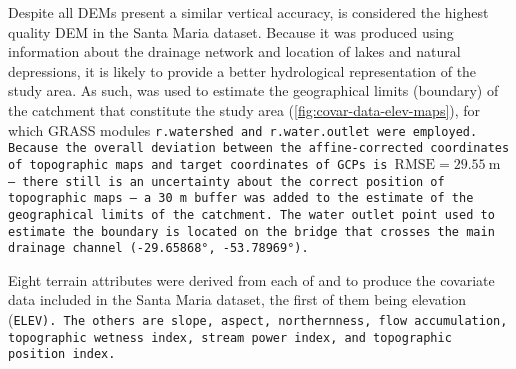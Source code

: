 

Despite all DEMs present a similar vertical accuracy, \demNew{} is considered the highest quality DEM in the 
Santa Maria dataset. Because it was produced using information about the drainage network and location of lakes
and natural depressions, it is likely to provide a better hydrological representation of the study area. As 
such, \demNew{} was used to estimate the geographical limits (boundary) of the catchment that constitute the 
study area (\autoref{fig:covar-data-elev-maps}), for which GRASS modules \tt{r.watershed} and 
\tt{r.water.outlet} were employed. Because the overall deviation between the affine-corrected coordinates of 
topographic maps and target coordinates of GCPs is $\text{RMSE} = \SI{29.55}{\m}$ -- there still is an 
uncertainty about the correct position of topographic maps -- a \SI{30}{\m} buffer was added to the estimate 
of the geographical limits of the catchment. The water outlet point used to estimate the boundary is located 
on the bridge that crosses the main drainage channel (\ang{-29.65868}, \ang{-53.78969}).

Eight terrain attributes were derived from each of \demOld{} and \demNew{} to produce the covariate data 
included in the Santa Maria dataset, the first of them being elevation (\tt{ELEV}). The others are slope, 
aspect, northernness, flow accumulation, topographic wetness index, stream power index, and topographic 
position index.


